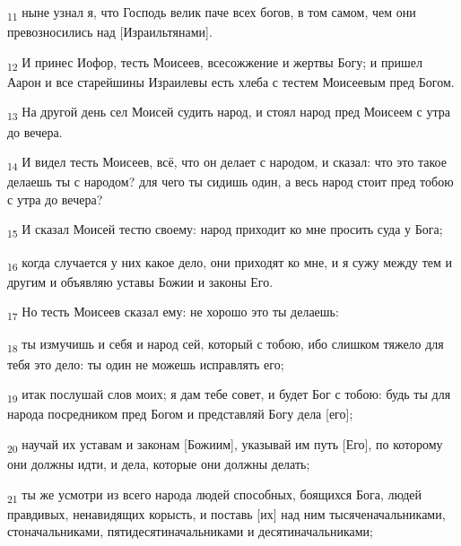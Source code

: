 \begin{tcolorbox}
\textsubscript{11} ныне узнал я, что Господь велик паче всех богов, в том самом, чем они превозносились над [Израильтянами].
\end{tcolorbox}
\begin{tcolorbox}
\textsubscript{12} И принес Иофор, тесть Моисеев, всесожжение и жертвы Богу; и пришел Аарон и все старейшины Израилевы есть хлеба с тестем Моисеевым пред Богом.
\end{tcolorbox}
\begin{tcolorbox}
\textsubscript{13} На другой день сел Моисей судить народ, и стоял народ пред Моисеем с утра до вечера.
\end{tcolorbox}
\begin{tcolorbox}
\textsubscript{14} И видел тесть Моисеев, всё, что он делает с народом, и сказал: что это такое делаешь ты с народом? для чего ты сидишь один, а весь народ стоит пред тобою с утра до вечера?
\end{tcolorbox}
\begin{tcolorbox}
\textsubscript{15} И сказал Моисей тестю своему: народ приходит ко мне просить суда у Бога;
\end{tcolorbox}
\begin{tcolorbox}
\textsubscript{16} когда случается у них какое дело, они приходят ко мне, и я сужу между тем и другим и объявляю уставы Божии и законы Его.
\end{tcolorbox}
\begin{tcolorbox}
\textsubscript{17} Но тесть Моисеев сказал ему: не хорошо это ты делаешь:
\end{tcolorbox}
\begin{tcolorbox}
\textsubscript{18} ты измучишь и себя и народ сей, который с тобою, ибо слишком тяжело для тебя это дело: ты один не можешь исправлять его;
\end{tcolorbox}
\begin{tcolorbox}
\textsubscript{19} итак послушай слов моих; я дам тебе совет, и будет Бог с тобою: будь ты для народа посредником пред Богом и представляй Богу дела [его];
\end{tcolorbox}
\begin{tcolorbox}
\textsubscript{20} научай их уставам и законам [Божиим], указывай им путь [Его], по которому они должны идти, и дела, которые они должны делать;
\end{tcolorbox}
\begin{tcolorbox}
\textsubscript{21} ты же усмотри из всего народа людей способных, боящихся Бога, людей правдивых, ненавидящих корысть, и поставь [их] над ним тысяченачальниками, стоначальниками, пятидесятиначальниками и десятиначальниками;
\end{tcolorbox}
